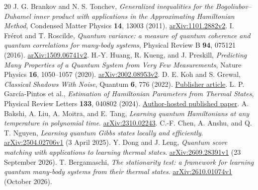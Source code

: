 \documentclass[11pt,a4paper]{article}
\theoremstyle{remark}
\begin{document}
\begingroup
\footnotesize
\begin{thebibliography}{20}
\setlength{\itemsep}{2pt}
 J. G. Brankov and N. S. Tonchev, \emph{Generalized inequalities for the Bogoliubov--Duhamel inner product with applications in the Approximating Hamiltonian Method}, Condensed Matter Physics \textbf{14}, 13003 (2011). \href{https://arxiv.org/abs/1101.2882v2}{arXiv:1101.2882v2}.
 I. Fr\'erot and T. Roscilde, \emph{Quantum variance: a measure of quantum coherence and quantum correlations for many-body systems}, Physical Review B \textbf{94}, 075121 (2016). \href{https://arxiv.org/abs/1509.06741v2}{arXiv:1509.06741v2}.
 H.-Y. Huang, R. Kueng, and J. Preskill, \emph{Predicting Many Properties of a Quantum System from Very Few Measurements}, Nature Physics \textbf{16}, 1050--1057 (2020). \href{https://arxiv.org/abs/2002.08953v2}{arXiv:2002.08953v2}.
 D. E. Koh and S. Grewal, \emph{Classical Shadows With Noise}, Quantum \textbf{6}, 776 (2022). \href{https://quantum-journal.org/papers/q-2022-08-16-776/}{Publisher article}.
 L. P. Garc\'ia-Pintos et al., \emph{Estimation of Hamiltonian Parameters from Thermal States}, Physical Review Letters \textbf{133}, 040802 (2024). \href{https://quantumsteampunk.umiacs.io/public/docs/LPGP_24_Estimation_PRL.pdf}{Author-hosted published paper}.
 A. Bakshi, A. Liu, A. Moitra, and E. Tang, \emph{Learning quantum Hamiltonians at any temperature in polynomial time}. \href{https://arxiv.org/abs/2310.02243}{arXiv:2310.02243}.
 C.-F. Chen, A. Anshu, and Q. T. Nguyen, \emph{Learning quantum Gibbs states locally and efficiently}. \href{https://arxiv.org/abs/2504.02706v1}{arXiv:2504.02706v1} (3 April 2025).
 Y. Dong and J. Leng, \emph{Quantum score matching with applications to learning thermal states}. \href{https://arxiv.org/abs/2609.28391v1}{arXiv:2609.28391v1} (23 September 2026).
 T. Bergamaschi, \emph{The stationarity test: a framework for learning quantum many-body systems from their thermal states}. \href{https://arxiv.org/abs/2610.01074v1}{arXiv:2610.01074v1} (October 2026).
\end{thebibliography}
\endgroup
\end{document}
